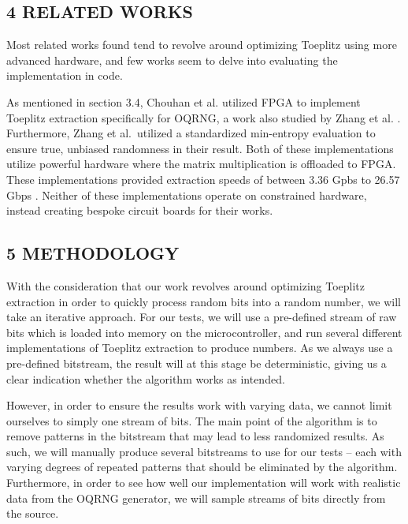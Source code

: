 \subsection{\texorpdfstring{4 RELATED WORKS }{4 RELATED WORKS }}\label{related-works}

Most related works found tend to revolve around optimizing Toeplitz using more advanced hardware, and few works seem to delve into evaluating the implementation in code.

As mentioned in section 3.4, Chouhan et al. \cite{toeplitz-desc} utilized FPGA to implement Toeplitz extraction specifically for OQRNG, a work also studied by Zhang et al. \cite{toeplitz}. Furthermore, Zhang et al.~utilized a standardized min-entropy evaluation to ensure true, unbiased randomness in their result. Both of these implementations utilize powerful hardware where the matrix multiplication is offloaded to FPGA. These implementations provided extraction speeds of between 3.36 Gpbs \cite{toeplitz} to 26.57 Gbps \cite{toeplitz-desc}. Neither of these implementations operate on constrained hardware, instead creating bespoke circuit boards for their works.

\subsection{5 METHODOLOGY}\label{methodology}

With the consideration that our work revolves around optimizing Toeplitz extraction in order to quickly process random bits into a random number, we will take an iterative approach. For our tests, we will use a pre-defined stream of raw bits which is loaded into memory on the microcontroller, and run several different implementations of Toeplitz extraction to produce numbers. As we always use a pre-defined bitstream, the result will at this stage be deterministic, giving us a clear indication whether the algorithm works as intended.

However, in order to ensure the results work with varying data, we cannot limit ourselves to simply one stream of bits. The main point of the algorithm is to remove patterns in the bitstream that may lead to less randomized results. As such, we will manually produce several bitstreams to use for our tests -- each with varying degrees of repeated patterns that should be eliminated by the algorithm. Furthermore, in order to see how well our implementation will work with realistic data from the OQRNG generator, we will sample streams of bits directly from the source.

